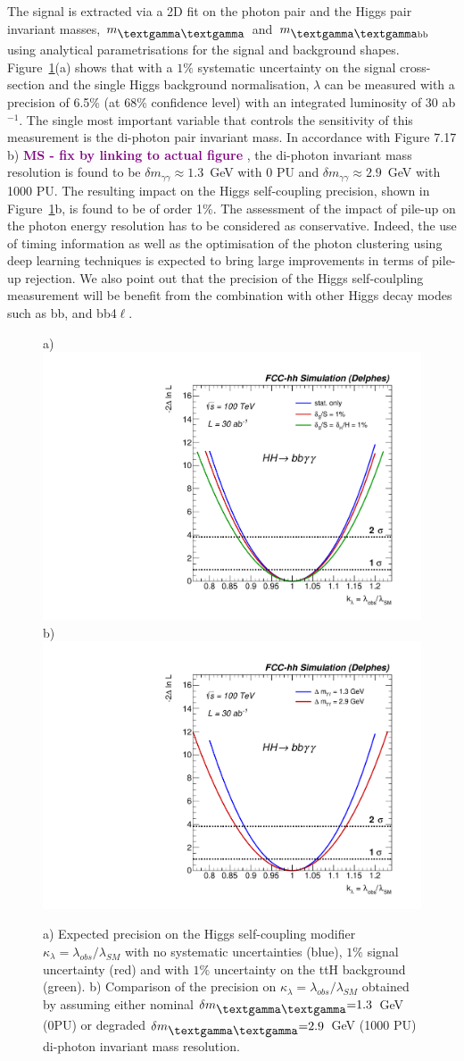 \documentclass[11pt,twoside,a4paper]{cernrep}
\newcommand{\MS}[1]{\textbf{\textcolor{purple}{MS - #1}}}
\begin{document}
The signal is extracted via a 2D fit on the photon pair and the Higgs pair invariant masses, $m_{\mbox{\textgamma\textgamma}}$ and $m_{\mbox{\textgamma\textgamma}\rm b b}$ using analytical parametrisations for the signal and background shapes. Figure~\ref{higgs}(a) shows that with a $1\%$ systematic uncertainty on the signal cross-section and the single Higgs background normalisation, $\lambda$ can be measured with a precision of 6.5\% (at 68\% confidence level) with an integrated luminosity of 30 ab$^{-1}$. The single most important variable that controls the sensitivity of this measurement is the di-photon pair invariant mass.
In accordance with Figure 7.17 b) \MS{fix by linking to actual figure} , the di-photon invariant mass resolution is found to be $\delta m_{\gamma\gamma}\approx 1.3$~GeV with 0 PU and $\delta m_{\gamma\gamma}\approx 2.9$~GeV with 1000 PU. The resulting impact on the Higgs self-coupling precision, shown in Figure~\ref{higgs}b, is found to be of order 1\%. The assessment of the impact of pile-up on the photon energy resolution has to be considered as conservative. Indeed, the use of timing information as well as the optimisation of the photon clustering using deep learning techniques is expected to bring large improvements in terms of pile-up rejection. We also point out that the precision of the Higgs self-coulpling measurement will be benefit from the combination with other Higgs decay modes such as bb\texttau\texttau, and bb4$\ell$.
%
\begin{figure}
  \centering
  a)
  \includegraphics[width=0.42\columnwidth]{hh_syst.pdf}
  b)
  \includegraphics[width=0.42\columnwidth]{hh_gamma.pdf}
  \caption{ a) Expected precision on the Higgs self-coupling modifier $\kappa_{\lambda}{=}\lambda_{obs}/\lambda_{SM}$ with no systematic uncertainties (blue), $1\%$ signal uncertainty (red) and with $1\%$ uncertainty on the ttH background (green). b) Comparison of the precision on $\kappa_{\lambda}{=}\lambda_{obs}/\lambda_{SM}$ obtained by assuming either nominal $\delta m_{\mbox{\textgamma\textgamma}} {=}1.3$~GeV (0PU) or degraded $\delta m_{\mbox{\textgamma\textgamma}}{=}2.9$~GeV (1000 PU) di-photon invariant mass resolution.}
  \label{higgs}
\end{figure}
\end{document}
